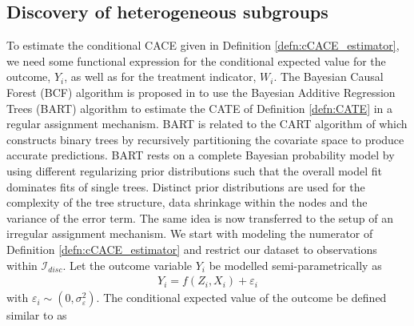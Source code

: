 \subsection{Discovery of heterogeneous subgroups}
\label{discovery}

To estimate the conditional CACE given in Definition \ref{defn:cCACE_estimator}, we need some functional expression for the conditional expected value for the outcome, $Y_i$, as well as for the treatment indicator, $W_i$.  
The Bayesian Causal Forest (BCF) algorithm is proposed in \cite{hahn_bayesian_2020} to use the Bayesian Additive Regression Trees (BART) algorithm \cite{chipman_bart_2010} to estimate the CATE of Definition \ref{defn:CATE} in a regular assignment mechanism. BART is related to the CART algorithm of \cite{Breiman1984} which constructs binary trees by recursively partitioning the covariate space to produce accurate predictions. 
BART rests on a complete Bayesian probability model by using different regularizing prior distributions such that the overall model fit dominates fits of single trees. Distinct prior distributions are used for the complexity of the tree structure, data shrinkage within the nodes and the variance of the error term. The same idea is now transferred to the setup of an irregular assignment mechanism.
We start with modeling the numerator of Definition \ref{defn:cCACE_estimator} and restrict our dataset to observations within $\mathcal{I}_{disc}$.
Let the outcome variable $Y_i$ be modelled semi-parametrically as 
\begin{align*}
    Y_i = f(Z_i, X_i) + \varepsilon_i 
\end{align*}
with $\varepsilon_i \sim \left(0, \sigma_{\varepsilon}^2\right)$. The conditional expected value of the outcome be defined similar to \cite{hahn_bayesian_2020} as 

